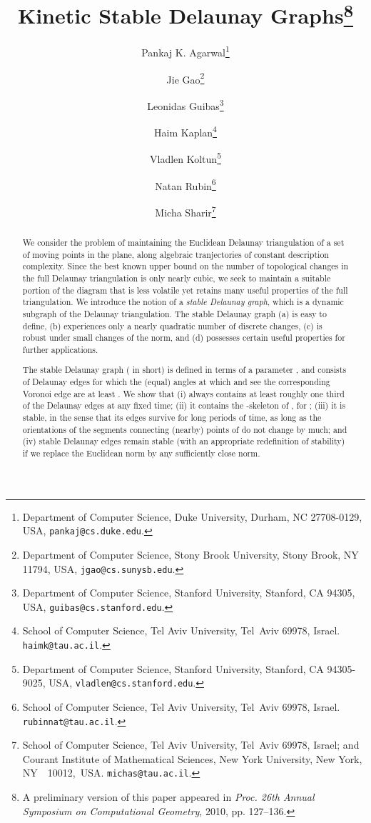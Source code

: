 \documentclass[letter,11pt]{article}
\begin{document}
\begin{titlepage}

\title{Kinetic Stable Delaunay Graphs\thanks{A preliminary version of this paper appeared in {\it Proc. 26th Annual Symposium on Computational Geometry}, 2010, pp. 127--136.}}

\author{Pankaj K. Agarwal\thanks{Department of Computer Science, Duke University, Durham, NC
    27708-0129, USA, {\tt pankaj@cs.duke.edu}.}
\and
Jie Gao\thanks{Department of Computer Science, Stony Brook University, Stony
Brook, NY 11794, USA, {\tt jgao@cs.sunysb.edu}. }
\and
Leonidas Guibas\thanks{Department of Computer Science, Stanford University, Stanford,
CA 94305, USA, {\tt guibas@cs.stanford.edu}.}
\and
Haim Kaplan\thanks{School of Computer Science, Tel Aviv University, Tel~Aviv 69978, Israel.
{\tt haimk@tau.ac.il}.}
\and
Vladlen Koltun\thanks{Department of Computer Science, Stanford University, Stanford,
CA 94305-9025, USA, {\tt vladlen@cs.stanford.edu}.}
\and
Natan Rubin\thanks{School of Computer Science, Tel Aviv University, Tel~Aviv 69978, Israel.
{\tt rubinnat@tau.ac.il}.}
\and
Micha Sharir\thanks{School of Computer Science, Tel Aviv University, Tel~Aviv 69978, Israel;
and Courant Institute of Mathematical Sciences, New York University,
New York, NY~~10012,~USA.  {\tt michas@tau.ac.il}.}
}

\maketitle


\begin{abstract}
We consider the problem of maintaining the Euclidean Delaunay
triangulation  of a set  of  moving points in the plane, along algebraic tranjectories of constant description complexity.
Since the best known upper bound on the number of topological changes 
in the full Delaunay triangulation is only nearly cubic, we seek 
to maintain a suitable portion of the diagram that is less volatile 
yet retains many useful properties of the full triangulation.  
We introduce the notion of a {\em stable Delaunay graph}, which is 
a dynamic subgraph of the Delaunay triangulation. The stable Delaunay graph (a) is easy to
define, (b) experiences only a nearly quadratic number of discrete 
changes, (c) is robust under small changes of the norm, and (d)
possesses certain useful properties for further applications.

The stable Delaunay graph ( in short) is defined in terms of
a parameter , and consists of Delaunay edges  for
which the (equal) angles at which  and  see the corresponding
Voronoi edge  are at least .
We show that (i)  always contains at least roughly one third of the
Delaunay edges at any fixed time; (ii) it contains the
-skeleton of , for ; (iii) it is
stable, in the sense that its edges survive for long periods of time,
as long as the orientations of the segments connecting (nearby) points
of  do not change by much; and (iv) stable Delaunay edges remain
stable (with an appropriate redefinition of stability) if we
replace the Euclidean norm by any sufficiently close norm.


\end{abstract}
\end{titlepage}
\end{document}
